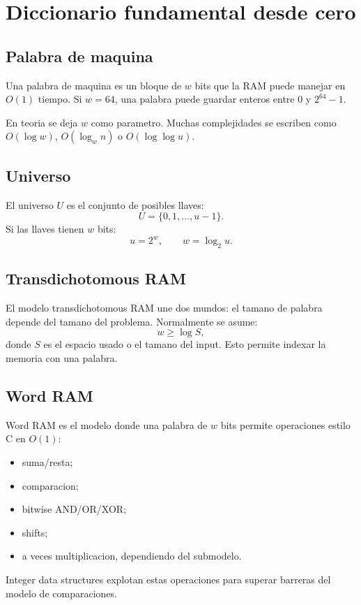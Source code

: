 \documentclass[10pt]{article}
\newcommand{\bigO}{O}
\begin{document}
\newpage
\section{Diccionario fundamental desde cero}

\subsection{Palabra de maquina}
Una palabra de maquina es un bloque de $w$ bits que la RAM puede manejar en
$\bigO(1)$ tiempo. Si $w=64$, una palabra puede guardar enteros entre $0$ y
$2^{64}-1$.

En teoria se deja $w$ como parametro. Muchas complejidades se escriben como
$\bigO(\log w)$, $\bigO(\log_w n)$ o $\bigO(\log\log u)$.

\subsection{Universo}
El universo $U$ es el conjunto de posibles llaves:
\[
U=\{0,1,\ldots,u-1\}.
\]
Si las llaves tienen $w$ bits:
\[
u=2^w,\qquad w=\log_2 u.
\]

\subsection{Transdichotomous RAM}
El modelo transdichotomous RAM une dos mundos: el tamano de palabra depende del
tamano del problema. Normalmente se asume:
\[
w\ge \log S,
\]
donde $S$ es el espacio usado o el tamano del input. Esto permite indexar la
memoria con una palabra.

\subsection{Word RAM}
Word RAM es el modelo donde una palabra de $w$ bits permite operaciones estilo C
en $\bigO(1)$:
\begin{itemize}[leftmargin=*]
\item suma/resta;
\item comparacion;
\item bitwise AND/OR/XOR;
\item shifts;
\item a veces multiplicacion, dependiendo del submodelo.
\end{itemize}
Integer data structures explotan estas operaciones para superar barreras del
modelo de comparaciones.
\end{document}
